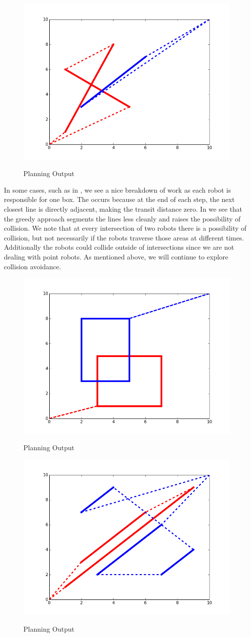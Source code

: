 \begin{figure}[h!]
\centering
\includegraphics[width=0.49\columnwidth]{figs/figure_1.png}
\label{fig:planner1}
\caption{Planning Output}
\end{figure}

In some cases, such as in , we see a nice breakdown of work as each robot is responsible for one box. The occurs because at the end of each step, the next closest line is directly adjacent, making the transit distance zero. In  we see that the greedy approach segments the lines less cleanly and raises the possibility of collision. We note that at every intersection of two robots there is a possibility of collision, but not necessarily if the robots traverse those areas at different times. Additionally the robots could collide outside of intersections since we are not dealing with point robots. As mentioned above, we will continue to explore collision avoidance. 

\begin{figure}[h!]
\centering
\includegraphics[width=0.49\columnwidth]{figs/figure_7.png}
\label{fig:planner2}
\caption{Planning Output}
\end{figure}

\begin{figure}[h!]
\centering
\includegraphics[width=0.49\columnwidth]{figs/figure_4.png}
\label{fig:planner3}
\caption{Planning Output}
\end{figure}